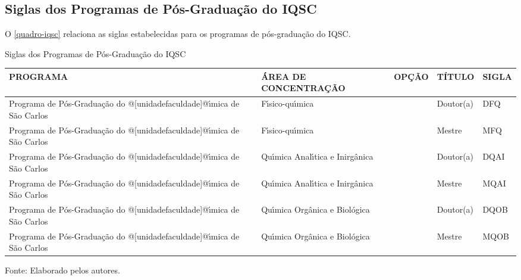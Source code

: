 \begin{apendicesenv}
\chapter{Siglas dos Programas de P\'os-Gradua\c{c}\~ao do IQSC}
O \autoref{quadro-iqsc} relaciona as siglas estabelecidas para os programas de p\'os-gradua\c{c}\~ao do IQSC.
\begin{quadro}[Htb]
\ABNTEXfontereduzida
\caption[Siglas dos Programas de P\'os-Gradua\c{c}\~ao do IQSC]{Siglas dos Programas de P\'os-Gradua\c{c}\~ao do IQSC}
\label{quadro-iqsc}
\begin{tabular}{|p{3.5cm}|p{3.5cm}|p{3.5cm}|p{1.5cm}|p{2.25cm}|}
  \hline
   \textbf{PROGRAMA} & \textbf{\'AREA DE CONCENTRA\c{C}\~AO} & \textbf{OP\c{C}\~AO} & \textbf{T\'ITULO} & \textbf{SIGLA}  \\
    \hline
Programa de P\'os-Gradua\c{c}\~ao do @[unidadefaculdade]@\'{\i}mica de S\~ao Carlos & F\'{\i}sico-qu\'{\i}mica &  & Doutor(a) & DFQ\\
Programa de P\'os-Gradua\c{c}\~ao do @[unidadefaculdade]@\'{\i}mica de S\~ao Carlos & F\'{\i}sico-qu\'{\i}mica &  & Mestre & MFQ\\
Programa de P\'os-Gradua\c{c}\~ao do @[unidadefaculdade]@\'{\i}mica de S\~ao Carlos & Qu\'{\i}mica Anal\'{\i}tica e Inirg\^anica &  & Doutor(a) & DQAI\\
Programa de P\'os-Gradua\c{c}\~ao do @[unidadefaculdade]@\'{\i}mica de S\~ao Carlos & Qu\'{\i}mica Anal\'{\i}tica e Inirg\^anica &  & Mestre & MQAI\\
Programa de P\'os-Gradua\c{c}\~ao do @[unidadefaculdade]@\'{\i}mica de S\~ao Carlos & Qu\'{\i}mica Org\^anica e Biol\'ogica &  & Doutor(a) & DQOB\\
Programa de P\'os-Gradua\c{c}\~ao do @[unidadefaculdade]@\'{\i}mica de S\~ao Carlos & Qu\'{\i}mica Org\^anica e Biol\'ogica &  & Mestre & MQOB\\
\hline

\end{tabular}
\begin{flushleft}
		Fonte: Elaborado pelos autores.\
\end{flushleft}
\end{quadro}


\end{apendicesenv}
